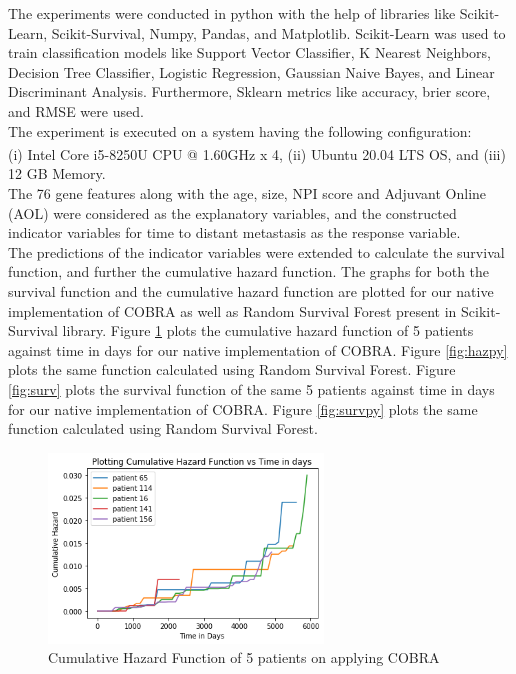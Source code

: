 \documentclass[13pt]{article}
\begin{document}
The experiments were conducted in python with the help of libraries like Scikit-Learn, Scikit-Survival, Numpy, Pandas, and Matplotlib. Scikit-Learn was used to train classification models like Support Vector Classifier, K Nearest Neighbors, Decision Tree Classifier, Logistic Regression, Gaussian Naive Bayes, and Linear Discriminant Analysis. Furthermore, Sklearn metrics like accuracy, brier score, and RMSE were used. \\

The experiment is executed on a system having the following configuration: \\
(i) Intel\textsuperscript{\tiny\textregistered} Core\textsuperscript{\texttrademark} i5-8250U CPU @ 1.60GHz x 4, (ii) Ubuntu 20.04 LTS OS, and (iii) 12 GB Memory. \\

The 76 gene features along with the age, size, NPI score and Adjuvant Online (AOL) were considered as the explanatory variables, and the constructed indicator variables for time to distant metastasis as the response variable. \\

The predictions of the indicator variables were extended to calculate the survival function, and further the cumulative hazard function. The graphs for both the survival function and the cumulative hazard function are plotted for our native implementation of COBRA as well as Random Survival Forest present in Scikit-Survival library. Figure \ref{fig:haz} plots the cumulative hazard function of 5 patients against time in days for our native implementation of COBRA. Figure \ref{fig:hazpy} plots the same function calculated using Random Survival Forest. Figure \ref{fig:surv} plots the survival function of the same 5 patients against time in days for our native implementation of COBRA. Figure \ref{fig:survpy} plots the same function calculated using Random Survival Forest. 

\begin{figure}[h!]
    \centering
    \includegraphics[width = 0.65\textwidth]{images/haz.png}
    \caption{Cumulative Hazard Function of 5 patients on applying COBRA }
    \label{fig:haz}
\end{figure}
\end{document}
